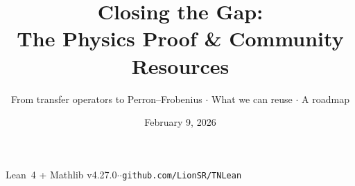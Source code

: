 \documentclass[aspectratio=169,10pt]{beamer}
\title{\textbf{Closing the Gap:\\The Physics Proof \& Community Resources}}
\subtitle{{\small From transfer operators to Perron--Frobenius  $\cdot$  What we can reuse  $\cdot$  A roadmap}}
\date{February 9, 2026}
\author{}
\begin{document}
{%
\begin{frame}
\vspace{-2em}
\maketitle
\vspace{-2em}
\begin{center}
{\footnotesize Lean~4 + Mathlib v4.27.0\quad$\cdot$\quad\cite{Cirac2021Matrix}\quad$\cdot$\quad\texttt{github.com/LionSR/TNLean}}
\end{center}
\end{frame}
}
\end{document}
